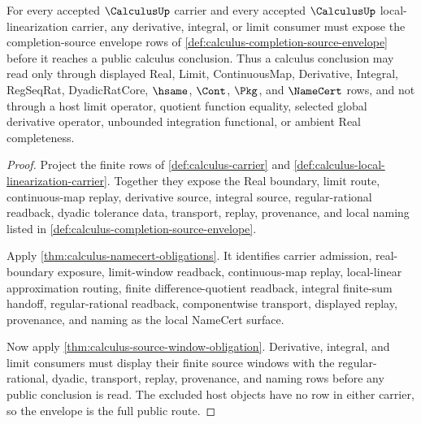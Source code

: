 \begin{theorem}
\label{thm:calculus-completion-source-envelope-obligations}
For every accepted $\CalculusUp$ carrier and every accepted $\CalculusUp$ local-linearization carrier, any derivative, integral, or limit consumer must expose the completion-source envelope rows of \autoref{def:calculus-completion-source-envelope} before it reaches a public calculus conclusion. Thus a calculus conclusion may read only through displayed Real, Limit, ContinuousMap, Derivative, Integral, RegSeqRat, DyadicRatCore, $\hsame$, $\Cont$, $\Pkg$, and $\NameCert$ rows, and not through a host limit operator, quotient function equality, selected global derivative operator, unbounded integration functional, or ambient Real completeness.
\end{theorem}
\begin{proof}
Project the finite rows of \autoref{def:calculus-carrier} and \autoref{def:calculus-local-linearization-carrier}. Together they expose the Real boundary, limit route, continuous-map replay, derivative source, integral source, regular-rational readback, dyadic tolerance data, transport, replay, provenance, and local naming listed in \autoref{def:calculus-completion-source-envelope}.

Apply \autoref{thm:calculus-namecert-obligations}. It identifies carrier admission, real-boundary exposure, limit-window readback, continuous-map replay, local-linear approximation routing, finite difference-quotient readback, integral finite-sum handoff, regular-rational readback, componentwise transport, displayed replay, provenance, and naming as the local NameCert surface.

Now apply \autoref{thm:calculus-source-window-obligation}. Derivative, integral, and limit consumers must display their finite source windows with the regular-rational, dyadic, transport, replay, provenance, and naming rows before any public conclusion is read. The excluded host objects have no row in either carrier, so the envelope is the full public route.
\end{proof}

